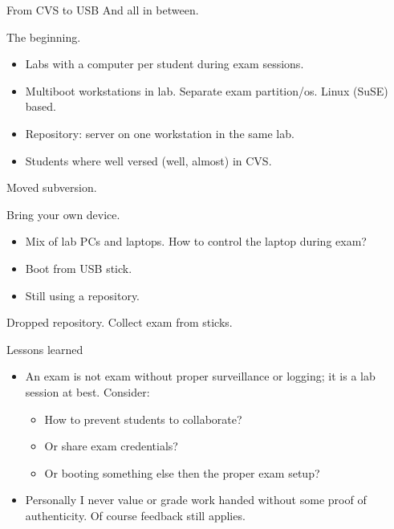 \begin{frame}{From CVS to USB}
  And all in between.
  \begin{description}[short]
  \item[2005] The beginning.
    \begin{itemize}
    \item Labs with a computer per student during exam sessions.
    \item Multiboot workstations in lab. Separate exam
      partition/os. Linux (SuSE) based.
    \item Repository:  server on one workstation in the same lab.
    \item Students where well versed (well, almost) in CVS.
    \end{itemize}
  \item[2009] Moved subversion.
  \item[2012] Bring your own device.
    \begin{itemize}
    \item Mix of lab PCs and laptops. How to control the laptop during exam?
    \item Boot from USB stick.
    \item Still using a repository.
    \end{itemize}
  \item[2015] Dropped repository. Collect exam from sticks.
  \end{description}
\end{frame}

\begin{frame}{Lessons learned}
  \begin{itemize}
  \item An exam is not exam without proper surveillance or logging; it
    is a lab session at best. Consider:
    \begin{itemize}
    \item How to prevent students to collaborate?
    \item Or share exam credentials?
    \item Or booting something else then the proper exam setup?
    \end{itemize}
  \item Personally I never value or grade work handed without some
    proof of authenticity. Of course feedback still applies.
  \end{itemize}
\end{frame}


